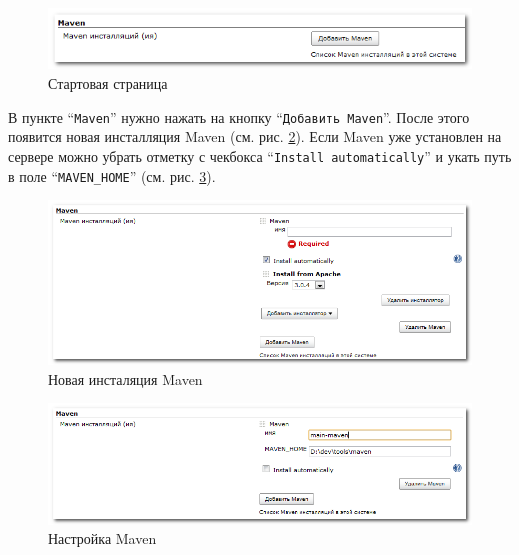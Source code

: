 \documentclass[a4paper,12pt]{article}
\begin{document}
\begin{figure}[htp]
\begin{minipage}[h]{1\linewidth}
\begin{center}
		\end{center}
	\end{minipage}
	\vfill
	\begin{minipage}[h]{1\linewidth}
		\begin{center}
			\includegraphics[scale = 1]{conf-maven.png}
			\caption{Стартовая страница}
			\label{pic.hudson.configuration.system-options.maven}
		\end{center}
	\end{minipage}
\end{figure}

В пункте ``\texttt{Maven}'' нужно нажать на кнопку ``\texttt{Добавить Maven}''. После этого появится новая инсталляция
Maven (см. рис. \ref{pic.hudson.configuration.system-options.maven-ni}). Если Maven уже установлен на сервере можно
убрать отметку с чекбокса ``\texttt{Install automatically}'' и укать путь в поле ``\texttt{MAVEN\_HOME}'' (см. рис.
\ref{pic.hudson.configuration.system-options.maven-conf}).

\begin{figure}[htp]
	\begin{center}
	  \includegraphics[scale = 0.6]{conf-maven-1.png}
	  \caption{Новая инсталяция Maven}
	  \label{pic.hudson.configuration.system-options.maven-ni}
	\end{center}
\end{figure}

\begin{figure}[htp]
	\begin{center}
	  \includegraphics[scale = 0.6]{conf-maven-2.png}
	  \caption{Настройка Maven}
	  \label{pic.hudson.configuration.system-options.maven-conf}
	\end{center}
\end{figure}
\end{document}
